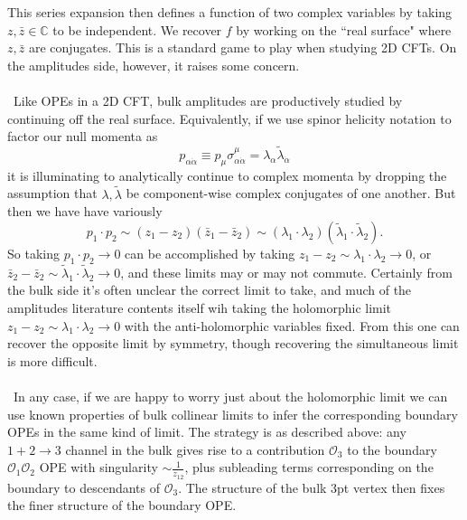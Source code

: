 \documentclass[11pt,letterpaper]{article}
\newcommand{\mc}[1]{\mathcal{#1}}
\newcommand{\C}{\mathbb{C}}
\begin{document}
This series expansion then defines a function of two complex variables by taking $z, \bar{z} \in \C$ to be independent. We recover $f$ by working on the ``real surface" where $z, \bar{z}$ are conjugates. This is a standard game to play when studying 2D CFTs. On the amplitudes side, however, it raises some concern. \\
\\
\
Like OPEs in a 2D CFT, bulk amplitudes are productively studied by continuing off the real surface. Equivalently, if we use spinor helicity notation to factor our null momenta as \begin{equation}
p_{\alpha \dot{\alpha}} \equiv p_\mu  \sigma^\mu_{\alpha \dot{\alpha}} = \lambda_\alpha \tilde{\lambda}_{\dot{\alpha}}
\end{equation}
it is illuminating to analytically continue to complex momenta by dropping the assumption that $\lambda, \tilde{\lambda}$ be component-wise complex conjugates of one another. But then we have have variously \begin{equation}
p_1 \cdot p_2 \sim (z_1 - z_2) (\bar{z}_1 - \bar{z}_2) \sim (\lambda_1 \cdot \lambda_2) (\tilde{\lambda}_1 \cdot \tilde{\lambda}_2).
\end{equation}
So taking $p_1 \cdot p_2 \to 0$ can be accomplished by taking $z_1 - z_2 \sim \lambda_1 \cdot \lambda_2 \to 0$, or $\bar{z}_2 - \bar{z}_2 \sim \tilde{\lambda}_1 \cdot \tilde{\lambda}_2 \to 0$, and these limits may or may not commute. Certainly from the bulk side it's often unclear the correct limit to take, and much of the amplitudes literature contents itself wih taking the holomorphic limit $z_1 - z_2 \sim \lambda_1 \cdot \lambda_2 \to 0$ with the anti-holomorphic variables fixed. From this one can recover the opposite limit by symmetry, though recovering the simultaneous limit is more difficult.\\
\\
\
In any case, if we are happy to worry just about the holomorphic limit we can use known properties of bulk collinear limits to infer the corresponding boundary OPEs in the same kind of limit. The strategy is as described above: any $1 + 2 \to 3$ channel in the bulk gives rise to a contribution $\mc{O}_3$ to the boundary $\mc{O}_1 \mc{O}_2$ OPE with singularity $\sim \frac{1}{z_{12}}$, plus subleading terms corresponding on the boundary to descendants of $\mc{O}_3$. The structure of the bulk 3pt vertex then fixes the finer structure of the boundary OPE.\\
\\
\end{document}
